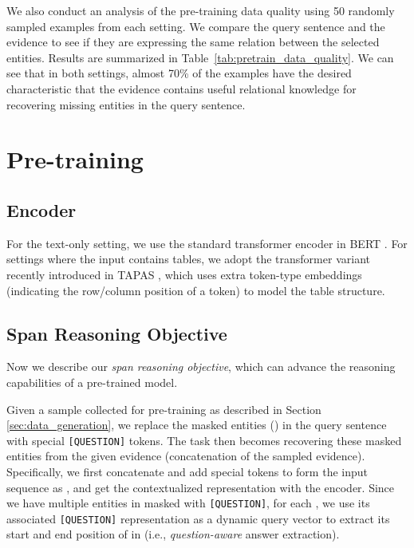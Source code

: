 \documentclass[11pt]{article}
\newcommand{\revise}[1]{#1}
\newcommand{\nop}[1]{}
\begin{document}
\revise{We also conduct an analysis of the pre-training data quality using 50 randomly sampled examples from each setting. We compare the query sentence and the evidence to see if they are expressing the same relation between the selected entities. Results are summarized in Table~\ref{tab:pretrain_data_quality}. We can see that in both settings, almost 70\% of the examples have the desired characteristic\nop{feature} that the evidence contains useful relational knowledge for recovering missing entities in the query sentence.}
 \section{Pre-training}
\subsection{Encoder}
\nop{In this work,  textual and tabular evidence is considered. }For the text-only setting, we use the standard transformer encoder in BERT \cite{devlin-etal-2019-bert}. For settings where the input contains tables, we adopt the transformer variant recently introduced in TAPAS \cite{herzig-etal-2020-tapas}, which uses extra token-type embeddings \nop{like row and column embeddings}{(indicating the row/column position of a token)} to model the table structure. 

\subsection{{Span Reasoning Objective}} 
{Now we describe our \textit{span reasoning objective}, which can advance the reasoning capabilities of a pre-trained model.}

Given a sample collected for pre-training as described in Section \ref{sec:data_generation}, we replace the masked entities  {()} in the query sentence  with special \texttt{[QUESTION]} tokens. The task then becomes recovering these masked entities from the given evidence  (concatenation of the sampled evidence)\nop{did we mention that  is the concatenation of the two evidences?}. Specifically, we first concatenate  and add special tokens to form the input sequence as , \nop{in pre-training, we don't have  after , right? yes}and get the contextualized representation  with the encoder. Since we have multiple entities in  masked with \texttt{[QUESTION]}, for each , we use its associated \texttt{[QUESTION]}  representation as a dynamic query vector  to extract its start and end position  of  in  (i.e., \textit{question-aware} answer extraction). \nop{check the equations.}
\end{document}
